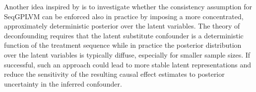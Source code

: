 Another idea inspired by  is to investigate 
whether the consistency assumption for SeqGPLVM can be enforced 
also in practice by imposing 
a more concentrated,
approximately deterministic posterior over the latent variables. 
The theory of deconfounding requires 
that the latent substitute confounder is a deterministic function of the 
treatment sequence 
while in practice the posterior distribution over the latent variables is 
typically diffuse, especially for smaller sample sizes. If successful, 
such an approach could lead 
to more stable latent representations 
and reduce the sensitivity of the resulting causal effect estimates to 
posterior uncertainty in the inferred confounder.